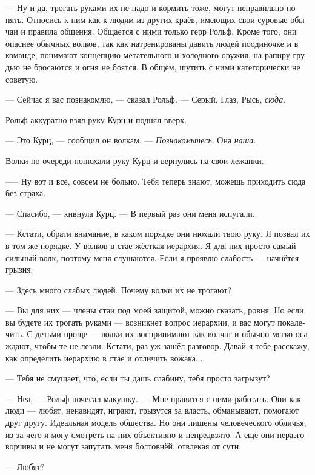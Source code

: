 \documentclass[a4paper,12pt,fleqn]{book}\usepackage{cooltooltips}\usepackage{polyglossia}\setdefaultlanguage[babelshorthands=true]{russian}\setotherlanguage{english}\defaultfontfeatures{Ligatures=TeX,Mapping=tex-text} \usepackage{xcolor}\definecolor{lightgray}{HTML}{bbbbbb}\color{lightgray}\newcommand{\ml}[3]{\textenglish{\textcolor{black}{#3}}}
\newcommand{\asterism}{\vspace{1em}{\centering\Large\bfseries$\ast~\ast~\ast$\par}\vspace{1em}}
\begin{document}
--- Ну и да, трогать руками их не надо и кормить тоже, могут неправильно понять.
Относись к ним как к людям из других краёв, имеющих свои суровые обычаи и правила общения.
Общается с ними только герр Рольф.
Кроме того, они опаснее обычных волков, так как натренированы давить людей поодиночке и в команде, понимают концепцию метательного и холодного оружия, на рапиру грудью не бросаются и огня не боятся.
В общем, шутить с ними категорически не советую. 

\asterism

--- Сейчас я вас познакомлю, --- сказал Рольф.
--- Серый, Глаз, Рысь, \textit{сюда}.

Рольф аккуратно взял руку Курц и поднял вверх.

--- Это Курц, --- сообщил он волкам.
--- \textit{Познакомьтесь}.
Она \textit{наша}.

Волки по очереди понюхали руку Курц и вернулись на свои лежанки.

--— Ну вот и всё, совсем не больно.
Тебя теперь знают, можешь приходить сюда без страха.

--- Спасибо, --- кивнула Курц.
--- В первый раз они меня испугали.

--- Кстати, обрати внимание, в каком порядке они нюхали твою руку.
Я позвал их в том же порядке.
У волков в стае жёсткая иерархия.
Я для них просто самый сильный волк, поэтому меня слушаются.
Если я проявлю слабость --- начнётся грызня.

--- Здесь много слабых людей.
Почему волки их не трогают?

--- Вы для них --- члены стаи под моей защитой, можно сказать, ровня.
Но если вы будете их трогать руками --- возникнет вопрос иерархии, и вас могут покалечить.
С детьми проще --- волки их воспринимают как волчат и обычно мягко осаждают, чтобы те не лезли.
Кстати, раз уж зашёл разговор.
Давай я тебе расскажу, как определить иерархию в стае и отличить вожака...

\asterism

--- Тебя не смущает, что, если ты дашь слабину, тебя просто загрызут?

--- Неа, --- Рольф почесал макушку.
--- Мне нравится с ними работать.
Они как люди --- любят, ненавидят, играют, грызутся за власть, обманывают, помогают друг другу.
Идеальная модель общества.
Но они лишены человеческого обличья, из-за чего я могу смотреть на них объективно и непредвзято.
А ещё они неразговорчивы и не могут запутать меня болтовнёй, отвлекая от сути.

--- Любят?
\end{document}
